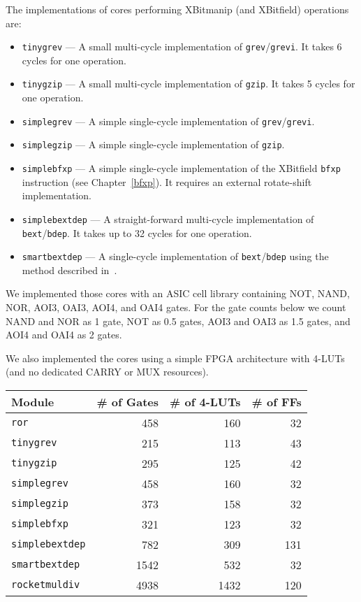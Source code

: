 The implementations of cores performing XBitmanip (and XBitfield) operations are:

\begin{itemize}
\item {\tt tinygrev} --- A small multi-cycle implementation of {\tt grev}/{\tt grevi}.
It takes 6 cycles for one operation.
\item {\tt tinygzip} --- A small multi-cycle implementation of {\tt gzip}.
It takes 5 cycles for one operation.
\item {\tt simplegrev} --- A simple single-cycle implementation of {\tt grev}/{\tt grevi}.
\item {\tt simplegzip} --- A simple single-cycle implementation of {\tt gzip}.
\item {\tt simplebfxp} --- A simple single-cycle implementation of the XBitfield {\tt bfxp}
instruction (see Chapter~\ref{bfxp}). It requires an external rotate-shift implementation.
\item {\tt simplebextdep} --- A straight-forward multi-cycle implementation of {\tt bext}/{\tt bdep}.
It takes up to 32 cycles for one operation.
\item {\tt smartbextdep} --- A single-cycle implementation of {\tt bext}/{\tt bdep}
using the method described in~\cite{Hilewitz06}.
\end{itemize}

We implemented those cores with an ASIC cell library containing NOT, NAND, NOR,
AOI3, OAI3, AOI4, and OAI4 gates. For the gate counts below we count NAND and NOR
as 1 gate, NOT as 0.5 gates, AOI3 and OAI3 as 1.5 gates, and AOI4 and OAI4 as 2 gates.

We also implemented the cores using a simple FPGA architecture with 4-LUTs (and no
dedicated CARRY or MUX resources).

\begin{center}
\begin{tabular}{lrrr}
Module & \# of Gates & \# of 4-LUTs & \# of FFs \\

\hline
{\tt ror} & 458 & 160 & 32 \\
\hline
{\tt tinygrev} & 215 & 113 & 43 \\
{\tt tinygzip} & 295 & 125 & 42 \\
\hline
{\tt simplegrev} & 458 & 160 & 32 \\
{\tt simplegzip} & 373 & 158 & 32 \\
{\tt simplebfxp} & 321 & 123 & 32 \\
{\tt simplebextdep} & 782 & 309 & 131 \\
\hline
{\tt smartbextdep} & 1542 & 532 & 32 \\
\hline
{\tt rocketmuldiv} & 4938 & 1432 & 120 \\

\end{tabular}
\end{center}

